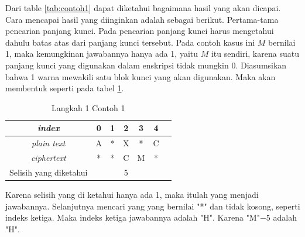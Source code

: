 	 Dari table \ref{tab:contoh1} dapat diketahui bagaimana hasil yang akan dicapai. Cara mencapai hasil yang diinginkan adalah sebagai berikut. Pertama-tama pencarian panjang kunci. Pada pencarian panjang kunci harus mengetahui dahulu batas atas dari panjang kunci tersebut. Pada contoh kasus ini $M$ bernilai 1, maka kemungkinan jawabannya hanya ada 1, yaitu $M$ itu sendiri, karena suatu panjang kunci yang digunakan dalam enskripsi tidak mungkin 0. Diasumsikan bahwa 1 warna mewakili satu blok kunci yang akan digunakan. Maka akan membentuk seperti pada tabel \ref{tab:langkah1contoh1}.
	 
	\begin{table}[H]
	 	\centering
	 	\setlength{\arrayrulewidth}{.08em}
	 	\begin{tabular}{|c|c|c|c|c|c|c|}\hline
	 	\textit{index}&0&1&2&3&4\\ \hline
	 	\textit{plain text}&\cellcolor{blue!15}A&\cellcolor{lime!15}*&\cellcolor{yellow!25}X&\cellcolor{green!15}*&\cellcolor{pink!25}C\\ \hline
	 	\textit{ciphertext}&\cellcolor{blue!15}*&\cellcolor{lime!15}*&\cellcolor{yellow!25}C&\cellcolor{green!15}M&\cellcolor{pink!25}*\\ \hline
	 	Selisih yang diketahui& & &5& & \\ \hline
	 	\end{tabular}
	 	\caption{Langkah 1 Contoh 1}
	 	\label{tab:langkah1contoh1}
	\end{table}
	
	  Karena selisih yang di ketahui hanya ada 1, maka itulah yang menjadi jawabannya. Selanjutnya mencari yang \plaintext yang bernilai "*" dan \ciphertext tidak kosong, seperti indeks ketiga. Maka indeks ketiga jawabannya adalah "H". Karena "M"$-5$ adalah "H".
	 
	 
	 
